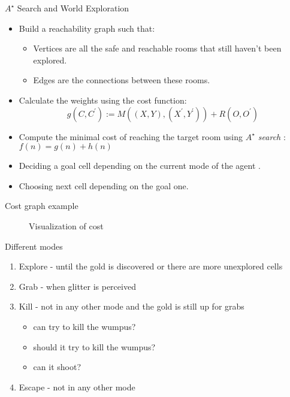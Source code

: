 \documentclass[smaller,dvipsnames,ratio=169]{beamer}
\begin{document}
  \begin{frame}{$A^{\star}$ Search and World Exploration}
	 \begin{itemize}
	 	\item Build a reachability graph such that:
		 	\begin{itemize}
				 \item Vertices are all the safe and reachable rooms that still haven't been explored.
				 \item Edges are the connections between these rooms.
		    \end{itemize}
	    \item Calculate the weights using the cost function: 
	    $$
	    g(C,C^\prime) := M((X,Y),(X^\prime,Y^\prime)) + R(O,O^\prime)
	    $$
	    \item Compute the minimal cost of reaching the target room using \emph{$A^{\star}$ search} : 
	    \(f(n) = g(n) + h(n)\)
	    \item Deciding a goal cell depending on the current mode of the agent .
	    \item Choosing next cell depending on the goal one.
		 
	 \end{itemize}
  \end{frame}

\begin{frame}{Cost graph example}
	\begin{figure}\centering
		
		\caption{Visualization of cost}
	\end{figure}
\end{frame}


  \begin{frame}{Different modes}
   \begin{enumerate}
   	\item Explore - until the gold is discovered or there are more unexplored cells 
   	\item Grab - when glitter is perceived
   	\item Kill - not in any other mode and the gold is still up for grabs
		   	\begin{itemize}
		   		\item can try to kill the wumpus?
		   		\item should it try to kill the wumpus?
		   		\item can it shoot?
		   	\end{itemize}
   	\item Escape - not in any other mode
   \end{enumerate}
  \end{frame}
\end{document}
